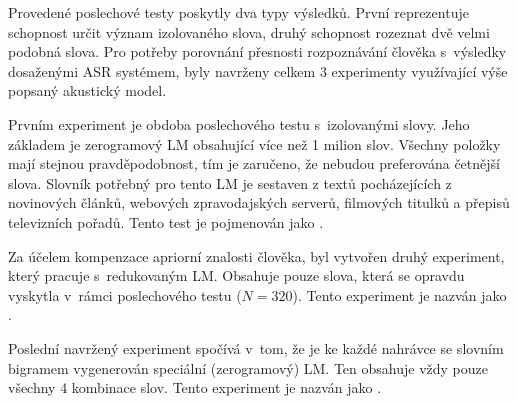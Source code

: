 Provedené poslechové testy poskytly dva typy výsledků.
První reprezentuje schopnost určit význam izolovaného slova, druhý schopnost rozeznat dvě velmi podobná slova.
Pro potřeby porovnání přesnosti rozpoznávání člověka s~výsledky dosaženými ASR systémem, byly navrženy celkem $3$ experimenty využívající výše popsaný akustický model.

Prvním experiment je obdoba poslechového testu
s~izolovanými slovy.
Jeho základem je zerogramový LM obsahující více než 1 milion slov.
Všechny položky mají stejnou pravděpodobnost, tím je zaručeno, že nebudou preferována četnější slova.
Slovník potřebný pro tento LM je sestaven z textů pocházejících z novinových článků, webových zpravodajských serverů, filmových titulků a přepisů televizních pořadů.
Tento test je pojmenován jako .

Za účelem kompenzace apriorní znalosti člověka, byl vytvořen druhý experiment, který pracuje s~redukovaným LM.
Obsahuje pouze slova, která se opravdu vyskytla v~rámci poslechového testu ($N = 320$).
Tento experiment je nazván jako .

Poslední navržený experiment spočívá v~tom, že je ke každé nahrávce se slovním bigramem vygenerován speciální (zerogramový) LM.
Ten obsahuje vždy pouze všechny 4 kombinace slov.
Tento experiment je nazván jako .

